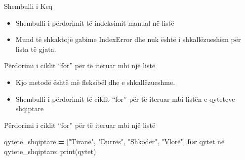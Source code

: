 \documentclass[
  ignorenonframetext,
]{beamer}
\newenvironment{Shaded}{\begin{snugshade}}{\end{snugshade}}
\newcommand{\BuiltInTok}[1]{#1}
\newcommand{\ControlFlowTok}[1]{\textcolor[rgb]{0.13,0.29,0.53}{\textbf{#1}}}
\newcommand{\NormalTok}[1]{#1}
\newcommand{\OperatorTok}[1]{\textcolor[rgb]{0.81,0.36,0.00}{\textbf{#1}}}
\newcommand{\StringTok}[1]{\textcolor[rgb]{0.31,0.60,0.02}{#1}}
\begin{document}
\begin{frame}{Shembulli i Keq}
\protect\hypertarget{shembulli-i-keq}{}
\begin{itemize}
\item
  Shembulli i përdorimit të indeksimit manual në listë
\item
  Mund të shkaktojë gabime IndexError dhe nuk është i shkallëzueshëm për
  lista të gjata.
\end{itemize}
\end{frame}

\begin{frame}{Përdorimi i ciklit ``for'' për të iteruar mbi një listë}
\protect\hypertarget{puxebrdorimi-i-ciklit-for-puxebr-tuxeb-iteruar-mbi-njuxeb-listuxeb}{}
\begin{itemize}
\item
  Kjo metodë është më fleksibël dhe e shkallëzueshme.
\item
  Shembulli i përdorimit të ciklit ``for'' për të iteruar mbi listën e
  qyteteve shqiptare
\end{itemize}
\end{frame}

\begin{frame}[fragile]{Përdorimi i ciklit ``for'' për të iteruar mbi një
listë}
\protect\hypertarget{puxebrdorimi-i-ciklit-for-puxebr-tuxeb-iteruar-mbi-njuxeb-listuxeb-1}{}
\begin{Shaded}
\begin{Highlighting}[]
\NormalTok{qytete\_shqiptare }\OperatorTok{=}\NormalTok{ [}\StringTok{"Tiranë"}\NormalTok{, }\StringTok{"Durrës"}\NormalTok{, }\StringTok{"Shkodër"}\NormalTok{, }\StringTok{"Vlorë"}\NormalTok{]}
\ControlFlowTok{for}\NormalTok{ qytet në qytete\_shqiptare:}
    \BuiltInTok{print}\NormalTok{(qytet)}
\end{Highlighting}
\end{Shaded}
\end{frame}
\end{document}

